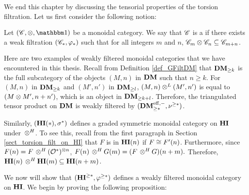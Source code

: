 We end this chapter by discussing the tensorial properties of the 
torsion filtration. Let us first consider the following notion:

\begin{defn}\label{def_graded_tensor}
Let $(\Cat{C}, \tensor, \Unit)$ be a monoidal category. We say 
that $\Cat{C}$ is a  if there 
exists a weak filtration $(\Cat{C}_*, \phi_*)$ such that for all
integers $m$ and $n$, $\Cat{C}_m \tensor \Cat{C}_n \subseteq
\Cat{C}_{m + n}$.
\end{defn}

\begin{ex}
Here are two examples of weakly filtered monoidal categories
that we have encountered in this thesis. Recall from Definition 
\ref{def_GFiltDM} that $\GFiltDM[k]{\DM}$ is the full subcategory
of the objects $(M, n)$ in $\DM$ such that $n \geq k$. For $(M, n)$
in $\GFiltDM[k]{\DM}$ and $(M', n')$ in $\GFiltDM[l]{\DM}$, $(M, n) \tDM (M', n')$
is equal to $(M \tensor M', n + n')$, which is an object in $\GFiltDM[k + l]{\DM}$.
Therefore, the triangulated tensor product on $\DM$ is weakly filtered
by $(\GFiltDM[*]{\DMeff}, \sgDM{*})$.

Similarly, $(\HI(*), \sgHI{*})$ defines a graded symmetric 
monoidal category on $\HI$ under $\tHI$. To see this, recall
from the first paragraph in Section \ref{sect_torsion_filt_on_HI}
that $F$ is in $\LHI[n]{\HI}$ if $F \cong \LHI[n]{F'}$. 
Furthermore, since $\LHI[n]{F} = F \tHI (\Ox)^{\tensor n}$, 
$\LHI[n]{F} \tHI \LHI[m]{G} = \LHI[n + m]{(F \tHI G)}.$ Therefore, 
$\LHI[n]{\HI} \tHI \LHI[m]{\HI} \subseteq \LHI[n + m]{\HI}$.
\end{ex}

We now will show that $(\THI{*}, \tgHI{*})$ defines a weakly filtered 
monoidal category on $\HI$. We begin by proving the following
proposition:

